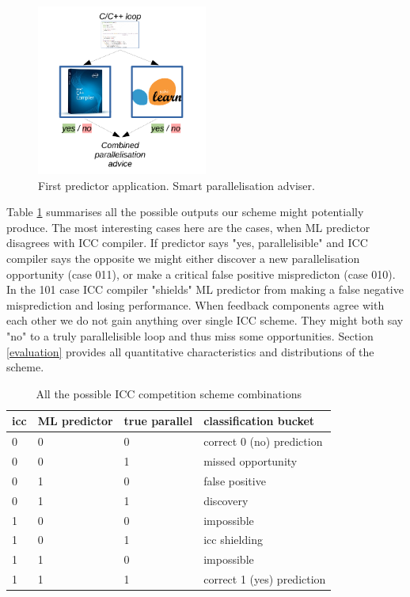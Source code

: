 \documentclass[sigconf,10pt,review,anonymous]{acmart}
\begin{document}
\begin{figure}[h]
\includegraphics[width=0.5\textwidth]{figures/icc_competition_scheme.pdf}
\caption{First predictor application. Smart parallelisation adviser. }
\label{fig:icc_competition_scheme}
\end{figure}

\quad Table \ref{tab:combinations_table} summarises all the possible outputs our scheme might potentially produce. The most interesting cases here are the cases, when ML predictor disagrees with ICC compiler. If predictor says "yes, parallelisible" and ICC compiler says the opposite we might either discover a new parallelisation opportunity (case 011), or make a critical false positive mispredicton (case 010). In the 101 case ICC compiler "shields" ML predictor from making a false negative misprediction and losing performance. When feedback components agree with each other we do not gain anything over single ICC scheme. They might both say "no" to a truly parallelisible loop and thus miss some opportunities. Section \ref{evaluation} provides all quantitative characteristics and distributions of the scheme. 

\begin{table}[h!]
    \centering
    \begin{tabular}[c]{|p{1.0cm}|p{1.5cm}|p{1.5cm}|p{2cm}|}
        \hline
        icc & ML predictor & true parallel & classification bucket \\
        \hline
        0 & 0 & 0 & correct 0 (no) prediction \\
        \hline
        0 & 0 & 1 & missed opportunity \\
        \hline
        0 & 1 & 0 & false positive \\
        \hline
        0 & 1 & 1 & discovery \\        
        \hline
        1 & 0 & 0 & impossible \\
        \hline
        1 & 0 & 1 & icc shielding \\
        \hline
        1 & 1 & 0 & impossible \\
        \hline
        1 & 1 & 1 & correct 1 (yes) prediction \\  
        \hline
    \end{tabular}
    \caption{All the possible ICC competition scheme combinations}
    \label{tab:combinations_table}
\end{table}
\end{document}
